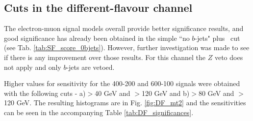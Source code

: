 \newpage
\subsection{Cuts in the different-flavour channel}

The electron-muon signal models overall provide better significance results, and good significance has already been obtained in the simple ``no $b$-jets" plus \mttwo \, cut (see Tab. \ref{tab:SF_score_0bjets}). However, further investigation was made to see if there is any improvement over those results.
For this channel the $Z$ veto does not apply and only $b$-jets are vetoed.

Higher values for sensitivity for the 400-200 and 600-100 signals were obtained with the following cuts - a)\metrel$>$40 GeV and \mttwo$>$120 GeV and b)\metrel$>$80 GeV and \mttwo$>$120 GeV. The resulting histograms are in Fig. \ref{fig:DF_mt2} and the sensitivities can be seen in the accompanying Table \ref{tab:DF_significances}.

